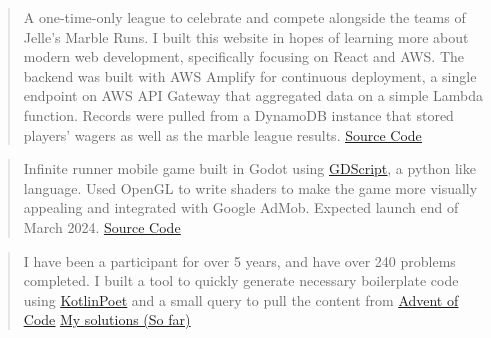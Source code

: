 

\begin{cvparagraph}

\begin{quote}
\thinspace A one-time-only league to celebrate and compete alongside the teams of Jelle's Marble Runs. I built this website in hopes of learning 
more about modern web development, specifically focusing on React and AWS. The backend was built with AWS Amplify for continuous deployment, a single endpoint on AWS API Gateway
that aggregated data on a simple Lambda function. Records were pulled from a DynamoDB instance that stored players' wagers as well as the marble league results.
\newline\href{https://github.com/johnsoe/thg_marbles}{\underline {Source Code}}
\end{quote}

\begin{quote}
\thinspace Infinite runner mobile game built in Godot using \href{https://docs.godotengine.org/en/stable/tutorials/scripting/gdscript/gdscript_basics.html}{\underline{GDScript}}, a python like language.
Used OpenGL to write shaders to make the game more visually appealing and integrated with Google AdMob. Expected launch end of March 2024. 
\newline\href{https://github.com/johnsoe/Track-Four}{\underline {Source Code}}
\end{quote}

\begin{quote}
\thinspace I have been a participant for over 5 years, and have over 240 problems completed.
I built a tool to quickly generate necessary boilerplate code using \href{https://square.github.io/kotlinpoet/}{\underline{KotlinPoet}} and a small query to pull the content from \href{https://adventofcode.com}{\underline{Advent of Code}}
\newline\href{https://github.com/johnsoe/advent_kotlin}{\underline {My solutions (So far)}}
\end{quote}


\end{cvparagraph}
